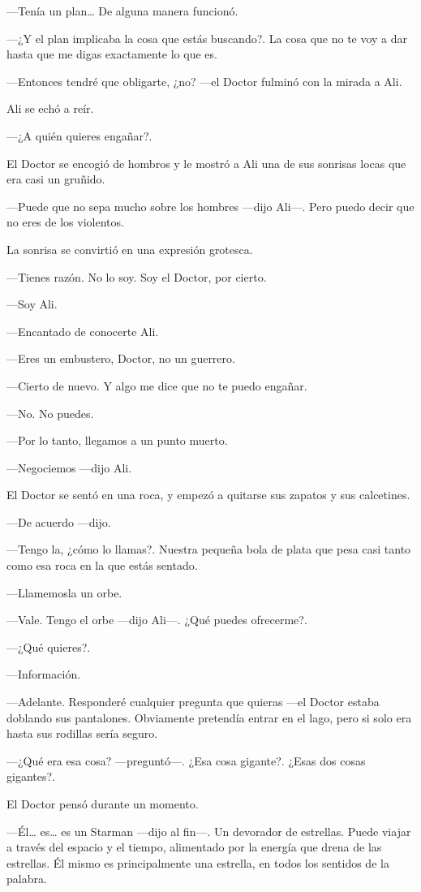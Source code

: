---Tenía un plan\ldots{} De alguna manera funcionó.

---¿Y el plan implicaba la cosa que estás buscando?. La cosa que no te
voy a dar hasta que me digas exactamente lo que es.

---Entonces tendré que obligarte, ¿no? ---el Doctor fulminó con la
mirada a Ali.

Ali se echó a reír.

---¿A quién quieres engañar?.

El Doctor se encogió de hombros y le mostró a Ali una de sus sonrisas
locas que era casi un gruñido.

---Puede que no sepa mucho sobre los hombres ---dijo Ali---. Pero puedo
decir que no eres de los violentos.

La sonrisa se convirtió en una expresión grotesca.

---Tienes razón. No lo soy. Soy el Doctor, por cierto.

---Soy Ali.

---Encantado de conocerte Ali.

---Eres un embustero, Doctor, no un guerrero.

---Cierto de nuevo. Y algo me dice que no te puedo engañar.

---No. No puedes.

---Por lo tanto, llegamos a un punto muerto.

---Negociemos ---dijo Ali.

El Doctor se sentó en una roca, y empezó a quitarse sus zapatos y sus
calcetines.

---De acuerdo ---dijo.

---Tengo la, ¿cómo lo llamas?. Nuestra pequeña bola de plata que pesa
casi tanto como esa roca en la que estás sentado.

---Llamemosla un orbe.

---Vale. Tengo el orbe ---dijo Ali---. ¿Qué puedes ofrecerme?.

---¿Qué quieres?.

---Información.

---Adelante. Responderé cualquier pregunta que quieras ---el Doctor
estaba doblando sus pantalones. Obviamente pretendía entrar en el lago,
pero si solo era hasta sus rodillas sería seguro.

---¿Qué era esa cosa? ---preguntó---. ¿Esa cosa gigante?. ¿Esas dos
cosas gigantes?.

El Doctor pensó durante un momento.

---Él\ldots{} es\ldots{} es un Starman ---dijo al fin---. Un devorador
de estrellas. Puede viajar a través del espacio y el tiempo, alimentado
por la energía que drena de las estrellas. Él mismo es principalmente
una estrella, en todos los sentidos de la palabra.

